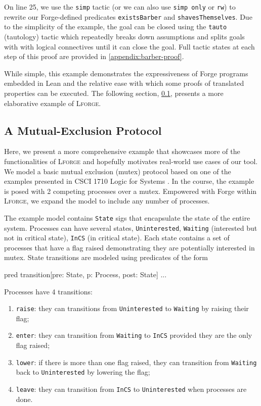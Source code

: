 On line 25, we use the \texttt{simp} tactic (or we can also use \texttt{simp only} or \texttt{rw}) to rewrite our Forge-defined predicates \texttt{existsBarber} and \texttt{shavesThemselves}. Due to the simplicity of the example, the goal can be closed using the \texttt{tauto} (tautology) tactic which repeatedly breaks down assumptions and splits goals with with logical connectives until it can close the goal. Full tactic states at each step of this proof are provided in \cref{appendix:barber-proof}. 

While simple, this example demonstrates the expressiveness of Forge programs embedded in Lean and the relative ease with which some proofs of translated properties can be executed. The following section, \cref{sec:mutex}, presents a more elaborative example of \textsc{Lforge}.

\subsection{A Mutual-Exclusion Protocol}\label{sec:mutex}

Here, we present a more comprehensive example that showcases more of the functionalities of \textsc{Lforge} and hopefully motivates real-world use cases of our tool. We model a basic mutual exclusion (mutex) protocol based on one of the examples presented in CSCI 1710 Logic for Systems \cite{l4s}. In the course, the example is posed with 2 competing processes over a mutex. Empowered with Forge within \textsc{Lforge}, we expand the model to include any number of processes. 

The example model contains \texttt{State} sigs that encapsulate the state of the entire system. Processes can have several states, \texttt{Uninterested}, \texttt{Waiting} (interested but not in critical state), \texttt{InCS} (in critical state). Each state contains a set of processes that have a flag raised demonstrating they are potentially interested in mutex. State transitions are modeled using predicates of the form
\begin{forge*}
pred transition[pre: State, p: Process, post: State] { ... }
\end{forge*}

Processes have 4 transitions: 
\begin{enumerate}
  \item \texttt{raise}: they can transitions from \texttt{Uninterested} to \texttt{Waiting} by raising their flag;
  \item \texttt{enter}: they can transition from \texttt{Waiting} to \texttt{InCS} provided they are the only flag raised;
  \item \texttt{lower}: if there is more than one flag raised, they can transition from \texttt{Waiting} back to \texttt{Uninterested} by lowering the flag;
  \item \texttt{leave}: they can transition from \texttt{InCS} to \texttt{Uninterested} when processes are done.
\end{enumerate}

